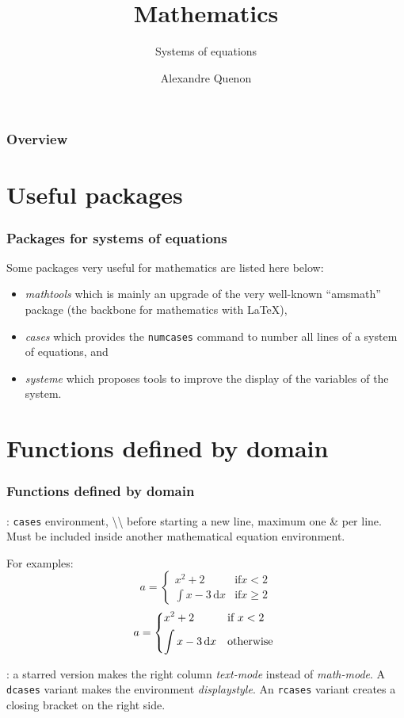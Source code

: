 \documentclass[11pt]{beamer}
\title{Mathematics}
\subtitle{Systems of equations}
\author[A. Quenon]{Alexandre Quenon}
\begin{document}
\begin{frame}
	\titlepage
\end{frame}


\begin{frame}
	\frametitle{Overview}
	
	\tableofcontents
\end{frame}


\section{Useful packages}

\begin{frame}
	\frametitle{Packages for systems of equations}

	Some packages very useful for mathematics are listed here below:
	\begin{itemize}
		\item \emph{mathtools} which is mainly an upgrade of the very well-known \enquote{amsmath} package (the backbone for mathematics with \LaTeX{}),
		\item \emph{cases} which provides the \texttt{numcases} command to number all lines of a system of equations, and
		\item \emph{systeme} which proposes tools to improve the display of the variables of the system.
	\end{itemize}
\end{frame}


\section{Functions defined by domain}

\begin{frame}
	\frametitle{Functions defined by domain}
	
	: \texttt{cases} environment, \textbackslash\textbackslash{} before starting a new line, maximum one \& per line.
	Must be included inside another mathematical equation environment.
	
	For examples:
	\begin{equation}
		a = \begin{cases}
			x^2 + 2					& \text{if} x<2  \\
			\int x-3\, \mathrm{d}x	& \text{if} x \geq 2
		\end{cases}
	\end{equation}
	\begin{equation}
		a = \begin{dcases*}
			x^2 + 2					& if  $x<2$  \\
			\int x-3\, \mathrm{d}x	& otherwise
		\end{dcases*}
	\end{equation}
	
	
	: a starred version makes the right column \emph{text-mode} instead of \emph{math-mode}.
	A \texttt{dcases} variant makes the environment \emph{displaystyle}.
	An \texttt{rcases} variant creates a closing bracket on the right side.
\end{frame}
\end{document}
